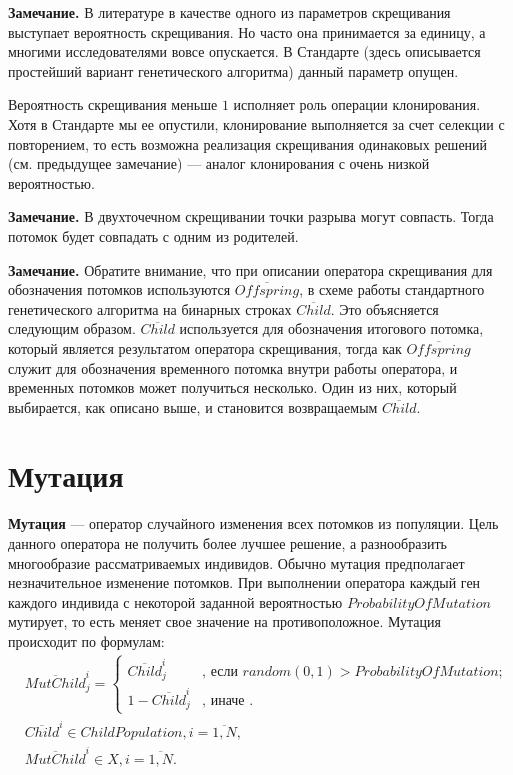 \textbf{Замечание.} В литературе в качестве одного из параметров скрещивания выступает вероятность скрещивания. Но часто она принимается за единицу, а многими исследователями вовсе опускается. В Стандарте (здесь описывается простейший вариант генетического алгоритма) данный параметр опущен.

Вероятность скрещивания меньше $ 1 $ исполняет роль операции клонирования. Хотя в Стандарте мы ее опустили, клонирование выполняется за счет селекции с повторением, то есть возможна реализация скрещивания одинаковых решений (см. предыдущее замечание)  --- аналог клонирования с очень низкой вероятностью.

\textbf{Замечание.} В двухточечном скрещивании точки разрыва могут совпасть. Тогда потомок будет совпадать с одним из родителей.

\textbf{Замечание.} Обратите внимание, что при описании оператора скрещивания для обозначения потомков используются $ \overline{Offspring} $, в схеме работы стандартного генетического алгоритма на бинарных строках $ \overline{Child} $. Это объясняется следующим образом. $ \overline{Child} $ используется для обозначения итогового потомка, который является результатом оператора скрещивания, тогда как $ \overline{Offspring} $ служит для обозначения временного потомка внутри работы оператора, и временных потомков может получиться несколько. Один из них, который выбирается, как описано выше, и становится возвращаемым $ \overline{Child} $.

\section{Мутация} \label{StandardGA:subsection_Mutation}

\textbf{Мутация} --- оператор случайного изменения всех потомков из популяции. Цель данного оператора  не получить более лучшее решение, а разнообразить многообразие рассматриваемых индивидов. Обычно мутация предполагает незначительное изменение потомков. При выполнении оператора каждый ген каждого индивида с некоторой заданной вероятностью  $ ProbabilityOfMutation $ мутирует, то есть меняет свое значение на противоположное. Мутация происходит по формулам:
\begin{align}
\label{StandardGA:eq:Mutation}
&\overline{MutChild}_j^i=\left\lbrace \begin{aligned}
\overline{Child}_j^i&\text{, если } random \left(0, 1 \right)>ProbabilityOfMutation; \\
1-\overline{Child}_j^i&\text{, иначе }.
\end{aligned}\right.\\
&\overline{Child}^i \in ChildPopulation, i=\overline{1,N},\nonumber\\
&\overline{MutChild}^i \in X, i=\overline{1,N}.\nonumber
\end{align}

